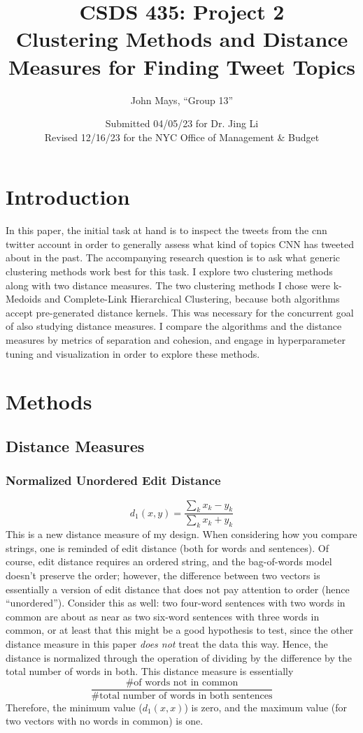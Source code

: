 \documentclass[fleqn]{article}
\title{\textbf{CSDS 435: Project 2\\\large{Clustering Methods and Distance Measures for Finding Tweet Topics}}}
\author{John Mays, ``Group 13''}
\date{Submitted 04/05/23 for Dr. Jing Li \\ Revised 12/16/23 for the NYC Office of Management \& Budget}
\begin{document}
\maketitle
\section{Introduction}
In this paper, the initial task at hand is to inspect the tweets from the \@ cnn twitter account in order to generally assess what kind of topics CNN has tweeted about in the past.  The accompanying research question is to ask what generic clustering methods work best for this task. I explore two clustering methods along with two distance measures.  The two clustering methods I chose were k-Medoids and Complete-Link Hierarchical Clustering, because both algorithms accept pre-generated distance kernels.  This was necessary for the concurrent goal of also studying distance measures.  I compare the algorithms and the distance measures by metrics of separation and cohesion, and engage in hyperparameter tuning and visualization in order to explore these methods.
\section{Methods}
\subsection{Distance Measures}
\subsubsection{Normalized Unordered Edit Distance}
$$d_{1}(x,y)=\frac{\sum_{k}x_k-y_k}{\sum_{k}x_k+y_k}$$
This is a new distance measure of my design. When considering how you compare strings, one is reminded of edit distance (both for words and sentences).  Of course, edit distance requires an ordered string, and the bag-of-words model doesn't preserve the order; however, the difference between two vectors is essentially a version of edit distance that does not pay attention to order (hence ``unordered'').  Consider this as well: two four-word sentences with two words in common are about as near as two six-word sentences with three words in common, or at least that this might be a good hypothesis to test, since the other distance measure in this paper \textit{does not} treat the data this way.  Hence, the distance is normalized through the operation of dividing by the difference by the total number of words in both.  This distance measure is essentially $$\frac{\text{\# of words not in common}}{\text{\# total number of words in both sentences}}$$ Therefore, the minimum value ($d_{1}(x,x)$) is zero, and the maximum value (for two vectors with no words in common) is one.
\end{document}
